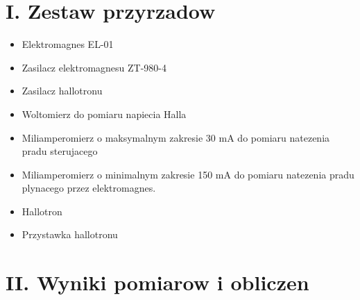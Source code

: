\documentclass[12pt,a4paper]{article}
\begin{document}
\maketitle
\newpage

\section*{I. Zestaw przyrzadow}
\begin{flushleft}
\begin{itemize}
	\item Elektromagnes EL-01
\item Zasilacz elektromagnesu ZT-980-4
\item Zasilacz hallotronu
\item Woltomierz do pomiaru napiecia Halla
\item Miliamperomierz o maksymalnym zakresie 30 mA do pomiaru natezenia pradu sterujacego
\item Miliamperomierz o minimalnym zakresie 150 mA do pomiaru natezenia pradu plynacego przez
elektromagnes.
\item Hallotron
\item Przystawka hallotronu
\end{itemize}

\section*{II. Wyniki pomiarow i obliczen}
\begin{center}




\end{center}
\end{flushleft}
\end{document}
